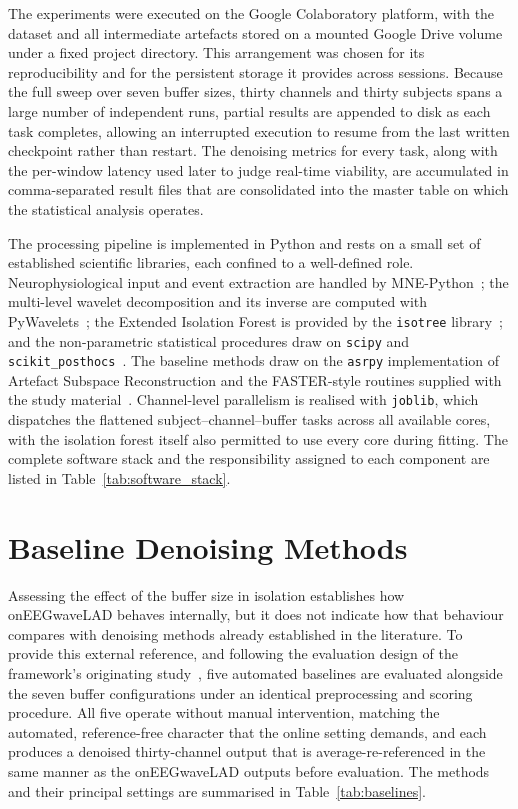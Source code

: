 \documentclass[MScCS,12pt,oneside,final]{uccthesis}
\begin{document}
The experiments were executed on the Google Colaboratory platform, with the dataset and all intermediate artefacts stored on a mounted Google Drive volume under a fixed project directory. This arrangement was chosen for its reproducibility and for the persistent storage it provides across sessions. Because the full sweep over seven buffer sizes, thirty channels and thirty subjects spans a large number of independent runs, partial results are appended to disk as each task completes, allowing an interrupted execution to resume from the last written checkpoint rather than restart. The denoising metrics for every task, along with the per-window latency used later to judge real-time viability, are accumulated in comma-separated result files that are consolidated into the master table on which the statistical analysis operates.

The processing pipeline is implemented in Python and rests on a small set of established scientific libraries, each confined to a well-defined role. Neurophysiological input and event extraction are handled by MNE-Python~\parencite{gramfort2013meg}; the multi-level wavelet decomposition and its inverse are computed with PyWavelets~\parencite{lee2019pywavelets}; the Extended Isolation Forest is provided by the \texttt{isotree} library~\parencite{cortes2019distance}; and the non-parametric statistical procedures draw on \texttt{scipy} and \texttt{scikit\_posthocs}~\parencite{virtanen2020scipy, terpilowski2019scikit}. The baseline methods draw on the \texttt{asrpy} implementation of Artefact Subspace Reconstruction and the FASTER-style routines supplied with the study material~\parencite{mullen2015real, nolan2010faster}. Channel-level parallelism is realised with \texttt{joblib}, which dispatches the flattened subject--channel--buffer tasks across all available cores, with the isolation forest itself also permitted to use every core during fitting. The complete software stack and the responsibility assigned to each component are listed in Table~\ref{tab:software_stack}.

\section{Baseline Denoising Methods}
\label{sec:baseline_methods}
 
Assessing the effect of the buffer size in isolation establishes how onEEGwaveLAD behaves internally, but it does not indicate how that behaviour compares with denoising methods already established in the literature. To provide this external reference, and following the evaluation design of the framework's originating study~\parencite{longo2025oneegwavelad}, five automated baselines are evaluated alongside the seven buffer configurations under an identical preprocessing and scoring procedure. All five operate without manual intervention, matching the automated, reference-free character that the online setting demands, and each produces a denoised thirty-channel output that is average-re-referenced in the same manner as the onEEGwaveLAD outputs before evaluation. The methods and their principal settings are summarised in Table~\ref{tab:baselines}.
\end{document}
